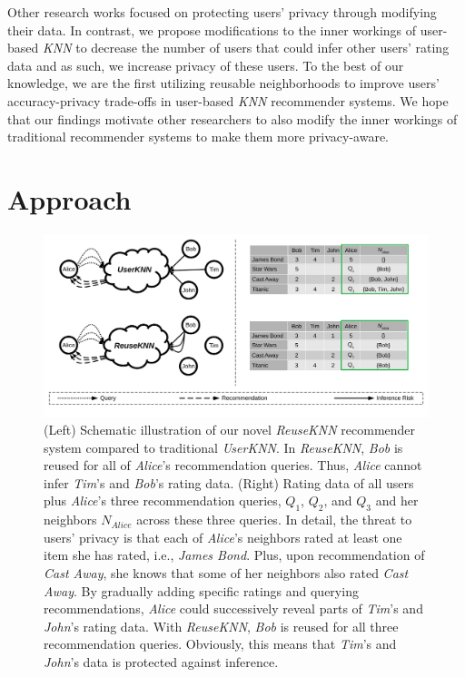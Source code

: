 \documentclass[manuscript,review,anonymous]{acmart}
\begin{document}
Other research works focused on protecting users' privacy through modifying their data.
In contrast, we propose modifications to the inner workings 
of user-based \emph{KNN} to decrease the number of users that could infer other users' rating data and as such, we increase privacy of these users.
To the best of our knowledge, we are the first utilizing reusable neighborhoods to improve users' accuracy-privacy trade-offs in user-based \emph{KNN} recommender systems.
We hope that our findings motivate other researchers to also modify the inner workings of traditional recommender systems to make them more privacy-aware.


\section{Approach}
\begin{figure}[!t]
    \centering
    \includegraphics[width=\textwidth]{figures/approach.pdf}
    \caption{
    (Left) Schematic illustration of our novel \emph{ReuseKNN} recommender system compared to traditional \emph{UserKNN}. 
    In \emph{ReuseKNN}, \emph{Bob} is reused for all of \emph{Alice}'s recommendation queries.
    Thus, \emph{Alice} cannot infer \emph{Tim}'s and \emph{Bob}'s rating data.
    (Right) Rating data of all users plus \emph{Alice}'s three recommendation queries, $Q_1$, $Q_2$, and $Q_3$ and her neighbors $N_{Alice}$ across these three queries. 
    In detail, the threat to users' privacy is that each of \emph{Alice}'s neighbors rated at least one item she has rated, i.e., \emph{James Bond}. Plus, upon recommendation of \emph{Cast Away}, she knows that some of her neighbors also rated \emph{Cast Away}. By gradually adding specific ratings and querying recommendations, \emph{Alice} could successively reveal parts of \emph{Tim}'s and \emph{John}'s rating data.
    With \emph{ReuseKNN}, \emph{Bob} is reused for all three recommendation queries. Obviously, this means that \emph{Tim}'s and \emph{John}'s data is protected against inference.
    }
    \label{fig:approach}
\end{figure}
\end{document}
